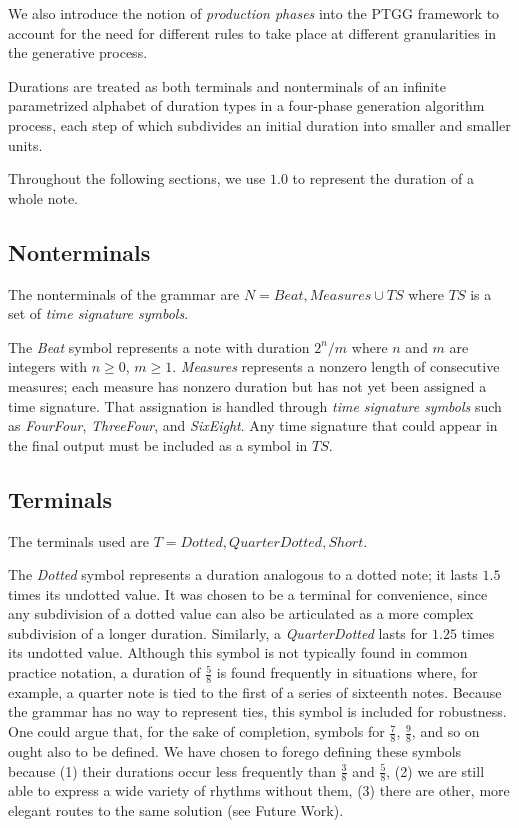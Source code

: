 \documentclass{article}
\begin{document}
We also introduce the notion of \emph{production phases} into the PTGG framework to account for the need for different rules to take place at different granularities in the generative process.

Durations are treated as both terminals and nonterminals of an infinite parametrized alphabet of duration types in a four-phase generation algorithm process, each step of which subdivides an initial duration into smaller and smaller units.

Throughout the following sections, we use $1.0$ to represent the duration of a whole note.

\subsection{Nonterminals}


The nonterminals of the grammar are $N={Beat, Measures} \cup TS$ where $TS$ is a set of \emph{time signature symbols}. 

The \emph{Beat} symbol represents a note with duration $2^n/m$ where $n$ and $m$ are integers with $n \geq 0$, $m \geq 1$. \emph{Measures} represents a nonzero length of consecutive measures; each measure has nonzero duration but has not yet been assigned a time signature. That assignation is handled through \emph{time signature symbols} such as \emph{FourFour}, \emph{ThreeFour}, and \emph{SixEight}. Any time signature that could appear in the final output must be included as a symbol in $TS$.

\subsection{Terminals}


The terminals used are $T={Dotted, QuarterDotted, Short}$.

The \emph{Dotted} symbol represents a duration analogous to a dotted note; it lasts $1.5$ times its undotted value. It was chosen to be a terminal for convenience, since any subdivision of a dotted value can also be articulated as a more complex subdivision of a longer duration. Similarly, a \emph{QuarterDotted} lasts for $1.25$ times its undotted value. Although this symbol is not typically found in common practice notation, a duration of $\frac{5}{8}$ is found frequently in situations where, for example, a quarter note is tied to the first of a series of sixteenth notes. Because the grammar has no way to represent ties, this symbol is included for robustness. One could argue that, for the sake of completion, symbols for $\frac{7}{8}$, $\frac{9}{8}$, and so on ought also to be defined. We have chosen to forego defining these symbols because (1) their durations occur less frequently than $\frac{3}{8}$ and $\frac{5}{8}$, (2) we are still able to express a wide variety of rhythms without them, (3) there are other, more elegant routes to the same solution (see Future Work).
\end{document}
